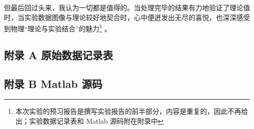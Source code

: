 \documentclass[UTF8]{article}
\theoremstyle{MyLineTheoremStyle} %
\theoremstyle{MyBlockTheoremStyle} %
\theoremstyle{MySubsubsectionStyle} %
\begin{document}
但最后回过头来，我认为一切都是值得的。当处理完毕的结果有力地验证了理论值时，当实验数据图像与理论较好地契合时，心中便迸发出无尽的喜悦，也深深感受到物理“理论与实验结合”的魅力\footnote{本次实验的预习报告是撰写实验报告的前半部分，内容是重复的，因此不再给出；实验数据记录表和 Matlab 源码附在附录中}
。












\newpage
\subsection*{附录 A\hspace*{20pt} 原始数据记录表}
\thispagestyle{fancy} 

\begin{figure}[H]\centering
    
\end{figure}


\subsection*{附录 B\hspace*{20pt} Matlab 源码}
\thispagestyle{fancy} 

\end{document}
